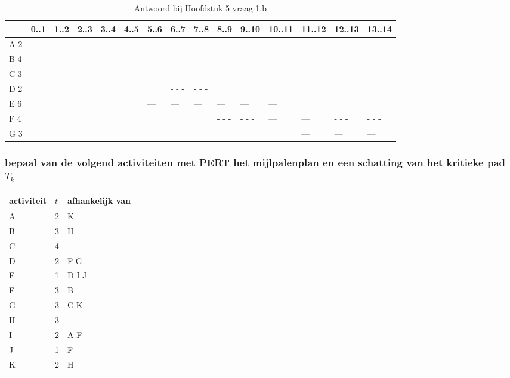\documentclass[a4paper,titlepage]{artikel1}
\begin{document}
   \begin{table}
     \caption{Antwoord bij Hoofdstuk 5 vraag 1.b} \label{r51b}
       \begin{tabular}[htb]{|l|l|l|l|l|l|l|l|l|l|l|l|l|l|l|}
         \hline
             & 0..1 & 1..2 & 2..3 & 3..4 & 4..5 & 5..6 & 6..7 & 7..8 & 8..9 & 9..10 & 10..11 & 11..12 & 12..13 & 13..14 \\
         \hline
         A 2 &  --- &  --- &      &      &      &      &      &      &      &       &        &        &        &\\
         \hline
         B 4 &      &      &  --- & ---  & ---  & ---  & - - -& - - -&      &       &        &        &        &\\
         \hline
         C 3 &      &      &  --- & ---  & ---  &      &      &      &      &       &        &        &        &\\
         \hline
         D 2 &      &      &      &      &      &      & - - -& - - -&      &       &        &        &        &\\
         \hline
         E 6 &      &      &      &      &      & ---  & ---  & ---  & ---  & ---   & ---    &        &        &\\
         \hline     
         F 4 &      &      &      &      &      &      &      &      & - - -& - - - & ---    & ---    & - - -  & - - -\\
         \hline
         G 3 &      &      &      &      &      &      &      &      &      &       &        & ---    & ---    & ---\\
         \hline
       \end{tabular}
   \end{table}
   
   \subsubsection[Opdracht 2]{bepaal van de volgend activiteiten met PERT het mijlpalenplan en een schatting van het kritieke pad $T_k$}
   \begin{center}
     \begin{tabular}{|l|l|l|}
     \hline
     activiteit & $t$ & afhankelijk van \\
     \hline
     A & 2 & K \\
     B & 3 & H \\
     C & 4 &\\
     D & 2 & F G \\
     E & 1 & D I J \\
     F & 3 & B \\
     G & 3 & C K \\
     H & 3 & \\
     I & 2 & A F \\
     J & 1 & F \\
     K & 2 & H \\
     \hline
     \end{tabular}
   \end{center}
\end{document}
